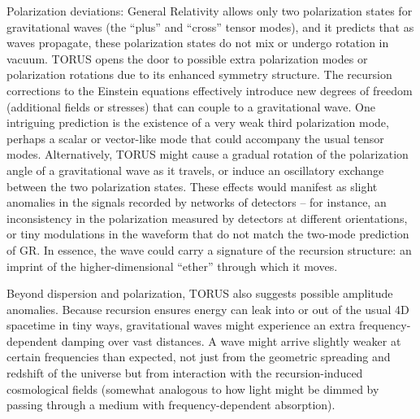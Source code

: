 \documentclass[]{article}
\begin{document}
Polarization deviations: General Relativity allows only two polarization
states for gravitational waves (the ``plus'' and ``cross'' tensor
modes), and it predicts that as waves propagate, these polarization
states do not mix or undergo rotation in vacuum. TORUS opens the door to
possible extra polarization modes or polarization rotations due to its
enhanced symmetry structure. The recursion corrections to the Einstein
equations effectively introduce new degrees of freedom (additional
fields or stresses) that can couple to a gravitational wave. One
intriguing prediction is the existence of a very weak third polarization
mode, perhaps a scalar or vector-like mode that could accompany the
usual tensor modes. Alternatively, TORUS might cause a gradual rotation
of the polarization angle of a gravitational wave as it travels, or
induce an oscillatory exchange between the two polarization states.
These effects would manifest as slight anomalies in the signals recorded
by networks of detectors -- for instance, an inconsistency in the
polarization measured by detectors at different orientations, or tiny
modulations in the waveform that do not match the two-mode prediction of
GR. In essence, the wave could carry a signature of the recursion
structure: an imprint of the higher-dimensional ``ether'' through which
it moves.

Beyond dispersion and polarization, TORUS also suggests possible
amplitude anomalies. Because recursion ensures energy can leak into or
out of the usual 4D spacetime in tiny ways, gravitational waves might
experience an extra frequency-dependent damping over vast distances. A
wave might arrive slightly weaker at certain frequencies than expected,
not just from the geometric spreading and redshift of the universe but
from interaction with the recursion-induced cosmological fields
(somewhat analogous to how light might be dimmed by passing through a
medium with frequency-dependent absorption).
\end{document}
